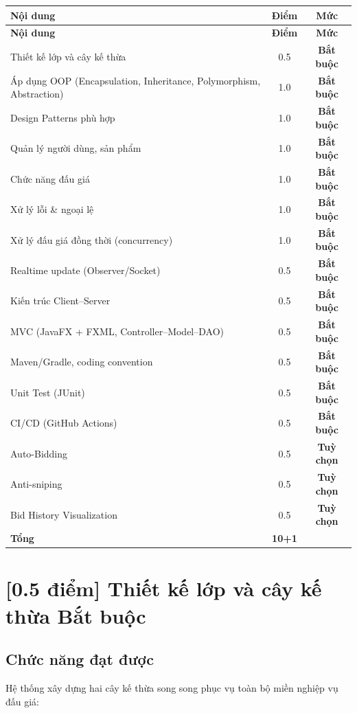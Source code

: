 \documentclass[12pt,a4paper]{article}
\newcommand{\score}[1]{\textbf{[#1 điểm]}}
\newcommand{\mandatory}{\textcolor{mandatorycolor}{\textbf{Bắt buộc}}}
\newcommand{\optional}{\textcolor{optionalcolor}{\textbf{Tuỳ chọn}}}
\begin{document}
\begin{longtable}{@{}p{7.5cm}cc@{}}
  \toprule
  \textbf{Nội dung} & \textbf{Điểm} & \textbf{Mức} \\
  \midrule
  \endfirsthead
  \toprule
  \textbf{Nội dung} & \textbf{Điểm} & \textbf{Mức} \\
  \midrule
  \endhead
  Thiết kế lớp và cây kế thừa & 0.5 & \mandatory \\
  Áp dụng OOP (Encapsulation, Inheritance, Polymorphism, Abstraction) & 1.0 & \mandatory \\
  Design Patterns phù hợp & 1.0 & \mandatory \\
  Quản lý người dùng, sản phẩm & 1.0 & \mandatory \\
  Chức năng đấu giá & 1.0 & \mandatory \\
  Xử lý lỗi \& ngoại lệ & 1.0 & \mandatory \\
  Xử lý đấu giá đồng thời (concurrency) & 1.0 & \mandatory \\
  Realtime update (Observer/Socket) & 0.5 & \mandatory \\
  Kiến trúc Client–Server & 0.5 & \mandatory \\
  MVC (JavaFX + FXML, Controller–Model–DAO) & 0.5 & \mandatory \\
  Maven/Gradle, coding convention & 0.5 & \mandatory \\
  Unit Test (JUnit) & 0.5 & \mandatory \\
  CI/CD (GitHub Actions) & 0.5 & \mandatory \\
  \midrule
  Auto-Bidding & 0.5 & \optional \\
  Anti-sniping & 0.5 & \optional \\
  Bid History Visualization & 0.5 & \optional \\
  \midrule
  \textbf{Tổng} & \textbf{10+1} & \\
  \bottomrule
\end{longtable}

\newpage


\section{\score{0.5} Thiết kế lớp và cây kế thừa \hfill \mandatory}

\subsection*{Chức năng đạt được}
Hệ thống xây dựng hai cây kế thừa song song phục vụ toàn bộ miền nghiệp vụ đấu giá:
\end{document}
